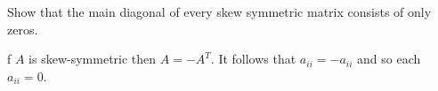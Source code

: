 
\begin{Exercise}[
name={},
title={}, 
difficulty=0,
origin={\cite{KK}}]
Show that the main diagonal of every skew symmetric matrix consists of only zeros.
\end{Exercise}

\begin{Answer}
f $A$ is skew-symmetric then $A=-A^{T}.$ It follows that $a_{ii}=-a_{ii}$ and so each $a_{ii}=0$.
\end{Answer}
